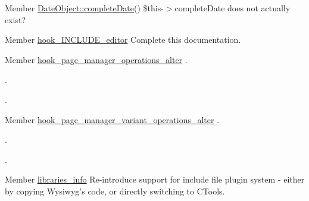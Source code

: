 \label{todo__todo000020}
\hypertarget{todo__todo000020}{}
 
\begin{DoxyDescription}
\item[Member \hyperlink{classDateObject_af83b95282617a2d2ec4dded415f84ed7}{DateObject::completeDate}() ]\$this-\/$>$completeDate does not actually exist? 
\end{DoxyDescription}

\label{todo__todo000064}
\hypertarget{todo__todo000064}{}
 
\begin{DoxyDescription}
\item[Member \hyperlink{wysiwyg_8api_8php_ad3605f8cb948779e59e72c711a7ff843}{hook\_\-INCLUDE\_\-editor} ]Complete this documentation. 
\end{DoxyDescription}

\label{todo__todo000009}
\hypertarget{todo__todo000009}{}
 
\begin{DoxyDescription}
\item[Member \hyperlink{group__hooks_gadade57abdccc892f62ed6bc7f089ca29}{hook\_\-page\_\-manager\_\-operations\_\-alter} ].



. 

. 
\end{DoxyDescription}

\label{todo__todo000012}
\hypertarget{todo__todo000012}{}
 
\begin{DoxyDescription}
\item[Member \hyperlink{group__hooks_gaf5d4ce054cae22b3bdca52011c6e8fbc}{hook\_\-page\_\-manager\_\-variant\_\-operations\_\-alter} ].



. 

. 
\end{DoxyDescription}

\label{todo__todo000038}
\hypertarget{todo__todo000038}{}
 
\begin{DoxyDescription}
\item[Member \hyperlink{libraries_8module_ae592b03bbea251cc7c008cd5ed10c861}{libraries\_\-info} ]Re-\/introduce support for include file plugin system -\/ either by copying Wysiwyg's code, or directly switching to CTools. 
\end{DoxyDescription}

\label{todo__todo000039}
\hypertarget{todo__todo000039}{}
 
